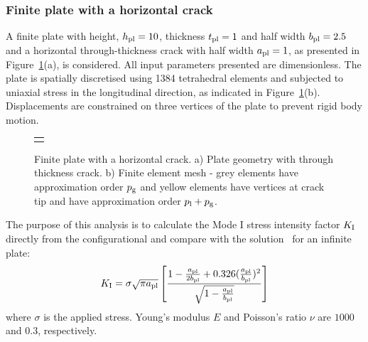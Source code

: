\documentclass[onecolumn]{svjour3}
\begin{document}
\subsubsection{Finite plate with a horizontal crack}\label{sec:plate_section}
A finite plate with height, $h_{\rm {pl}} = 10$, thickness $t_{\rm {pl}}=1$ and half width $b_{\rm{pl}} = 2.5$ and a horizontal through-thickness crack with half width $a_{\rm {pl}} = 1$, as presented in Figure~\ref{fig:plate_load_mesh}(a), is considered. All input parameters presented are dimensionless. 
The  plate is spatially discretised using 1384 tetrahedral elements and subjected to uniaxial stress in the longitudinal direction, as indicated in Figure~\ref{fig:plate_load_mesh}(b). 
Displacements are constrained on three vertices of the plate to prevent rigid body motion. 

\begin{figure}[h!]
\begin{center}
\begin{tabular}{c}
{\def\svgwidth{8cm} }\\
\end{tabular}
\caption{Finite plate with a horizontal crack. a) Plate geometry with through thickness crack. b) Finite element mesh - grey elements have approximation order $p_{\rm g}$ and yellow elements have vertices at crack tip and have approximation order $p_{\rm l}+p_{\rm g}$. }
\label{fig:plate_load_mesh}
\end{center}
\end{figure}

The purpose of this analysis is to calculate the Mode I stress intensity factor $ K_{\rm I} $ directly from the configurational and compare with the solution~\cite{rooke1976compendium} for an infinite plate:
\begin{equation}\label{eq:frac_analytical}
K_{\rm I}=\sigma \sqrt{\pi a_{\rm {pl}}} \left[  \frac{1 - \frac{a_{\rm {pl}}}{2b_{\rm {pl}}} + 0.326 (\frac{a_{\rm {pl}}}{b_{\rm {pl}}})^2 }{\sqrt{1-\frac{a_{\rm {pl}}}{b_{\rm {pl}}}}}  \right]
\end{equation}
where $\sigma $ is the applied stress. 
Young's modulus $E$ and Poisson's ratio $\nu$ are $1000$ and $0.3$, respectively. 
\end{document}
